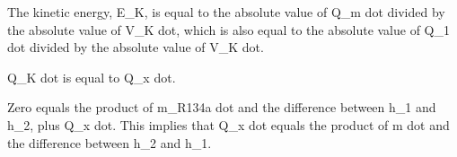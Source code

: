 The kinetic energy, E_K, is equal to the absolute value of Q_m dot divided by the absolute value of V_K dot, which is also equal to the absolute value of Q_1 dot divided by the absolute value of V_K dot.

Q_K dot is equal to Q_x dot.

Zero equals the product of m_R134a dot and the difference between h_1 and h_2, plus Q_x dot. This implies that Q_x dot equals the product of m dot and the difference between h_2 and h_1.